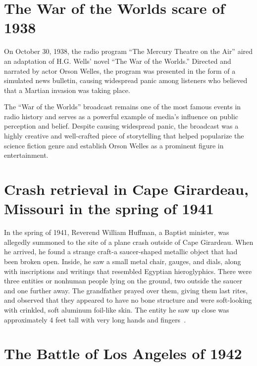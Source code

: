 \section{The War of the Worlds scare of 1938}
\label{2023-UFO-part-History-chapter-pre-1945-WW1938}

On October 30, 1938, the radio program ``The Mercury Theatre on the Air'' aired an adaptation of H.G. Wells' novel ``The War of the Worlds.'' Directed and narrated by actor Orson Welles, the program was presented in the form of a simulated news bulletin, causing widespread panic among listeners who believed that a Martian invasion was taking place.

The ``War of the Worlds'' broadcast remains one of the most famous events in radio history and serves as a powerful example of media's influence on public perception and belief. Despite causing widespread panic, the broadcast was a highly creative and well-crafted piece of storytelling that helped popularize the science fiction genre and establish Orson Welles as a prominent figure in entertainment.


\section{Crash retrieval in Cape Girardeau, Missouri  in the spring of 1941}
\label{2023-UFO-part-History-chapter-pre-1945-CGM}


In the spring of 1941, Reverend William Huffman, a Baptist minister, was allegedly summoned to the site of a plane crash outside of Cape Girardeau.
When he arrived, he found a strange craft-a saucer-shaped metallic object that had been broken open.
Inside, he saw a small metal chair, gauges, and dials, along with inscriptions and writings that resembled Egyptian hieroglyphics.
There were three entities or nonhuman people lying on the ground, two outside the saucer and one further away.
The grandfather prayed over them, giving them last rites,
and observed that they appeared to have no bone structure and were soft-looking with crinkled, soft aluminum foil-like skin.
The entity he saw up close was approximately 4 feet tall with very long hands and fingers~\cite[pp.~34-43]{Wood2005Jan}.


\section{The Battle of Los Angeles of 1942}
\label{2023-UFO-part-History-chapter-pre-1945-boLA1942}


